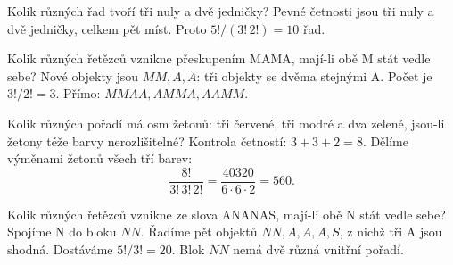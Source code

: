 \documentclass[11pt,a4paper]{article}
\begin{document}
\begin{zadaniReseniBox}[title={Úloha C2}]
Kolik různých řad tvoří tři nuly a dvě jedničky?
\tcblower
Pevné četnosti jsou tři nuly a dvě jedničky, celkem pět míst. Proto $5!/(3!\,2!)=10$ řad.
\end{zadaniReseniBox}

\begin{zadaniReseniBox}[title={Úloha C3}]
Kolik různých řetězců vznikne přeskupením \textsc{MAMA}, mají-li obě M stát vedle sebe?
\tcblower
Nové objekty jsou $MM,A,A$: tři objekty se dvěma stejnými A. Počet je $3!/2!=3$. Přímo: $MMAA,AMMA,AAMM$.
\end{zadaniReseniBox}

\begin{zadaniReseniBox}[title={Úloha C4}]
Kolik různých pořadí má osm žetonů: tři červené, tři modré a dva zelené, jsou-li žetony téže barvy nerozlišitelné?
\tcblower
Kontrola četností: $3+3+2=8$. Dělíme výměnami žetonů všech tří barev:
\[
\frac{8!}{3!\,3!\,2!}=\frac{40320}{6\cdot6\cdot2}=560.
\]
\end{zadaniReseniBox}

\begin{zadaniReseniBox}[title={Úloha C5}]
Kolik různých řetězců vznikne ze slova \textsc{ANANAS}, mají-li obě N stát vedle sebe?
\tcblower
Spojíme N do bloku $NN$. Řadíme pět objektů $NN,A,A,A,S$, z nichž tři A jsou shodná. Dostáváme $5!/3!=20$. Blok $NN$ nemá dvě různá vnitřní pořadí.
\end{zadaniReseniBox}


\end{document}
